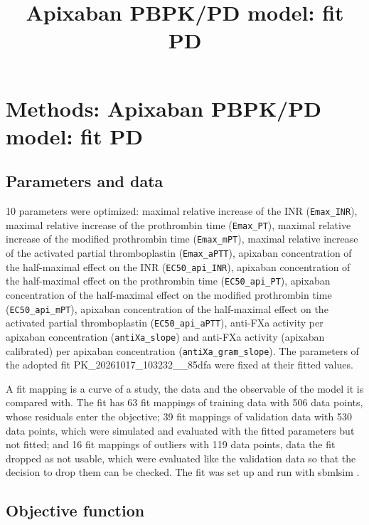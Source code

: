 \documentclass{article}
\title{Apixaban PBPK/PD model: fit PD}
\date{}
\begin{document}
\maketitle

\section{Methods: Apixaban PBPK/PD model: fit PD}

\subsection{Parameters and data}

10 parameters were optimized: maximal relative increase of the INR (\texttt{Emax\_INR}), maximal relative increase of the prothrombin time (\texttt{Emax\_PT}), maximal relative increase of the modified prothrombin time (\texttt{Emax\_mPT}), maximal relative increase of the activated partial thromboplastin (\texttt{Emax\_aPTT}), apixaban concentration of the half-maximal effect on the INR (\texttt{EC50\_api\_INR}), apixaban concentration of the half-maximal effect on the prothrombin time (\texttt{EC50\_api\_PT}), apixaban concentration of the half-maximal effect on the modified prothrombin time (\texttt{EC50\_api\_mPT}), apixaban concentration of the half-maximal effect on the activated partial thromboplastin (\texttt{EC50\_api\_aPTT}), anti-FXa activity per apixaban concentration (\texttt{antiXa\_slope}) and anti-FXa activity (apixaban calibrated) per apixaban concentration (\texttt{antiXa\_gram\_slope}). The parameters of the adopted fit PK\_20261017\_103232\_\_85dfa were fixed at their fitted values.

A fit mapping is a curve of a study, the data and the observable of the model it is compared with. The fit has 63 fit mappings of training data with 506 data points, whose residuals enter the objective; 39 fit mappings of validation data with 530 data points, which were simulated and evaluated with the fitted parameters but not fitted; and 16 fit mappings of outliers with 119 data points, data the fit dropped as not usable, which were evaluated like the validation data so that the decision to drop them can be checked. The fit was set up and run with sbmlsim \cite{Koenig2026_sbmlsim}.

\subsection{Objective function}
\end{document}
